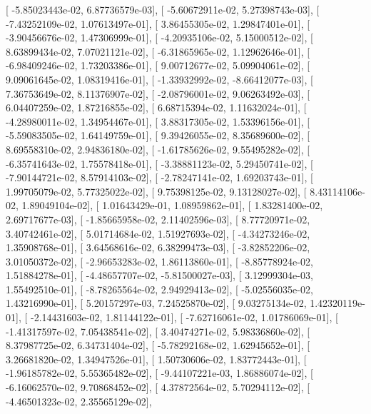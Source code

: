 \documentclass{article}
\begin{document}
       [ -5.85023443e-02,   6.87736579e-03],
       [ -5.60672911e-02,   5.27398743e-03],
       [ -7.43252109e-02,   1.07613497e-01],
       [  3.86455305e-02,   1.29847401e-01],
       [ -3.90456676e-02,   1.47306999e-01],
       [ -4.20935106e-02,   5.15000512e-02],
       [  8.63899434e-02,   7.07021121e-02],
       [ -6.31865965e-02,   1.12962646e-01],
       [ -6.98409246e-02,   1.73203386e-01],
       [  9.00712677e-02,   5.09904061e-02],
       [  9.09061645e-02,   1.08319416e-01],
       [ -1.33932992e-02,  -8.66412077e-03],
       [  7.36753649e-02,   8.11376907e-02],
       [ -2.08796001e-02,   9.06263492e-03],
       [  6.04407259e-02,   1.87216855e-02],
       [  6.68715394e-02,   1.11632024e-01],
       [ -4.28980011e-02,   1.34954467e-01],
       [  3.88317305e-02,   1.53396156e-01],
       [ -5.59083505e-02,   1.64149759e-01],
       [  9.39426055e-02,   8.35689600e-02],
       [  8.69558310e-02,   2.94836180e-02],
       [ -1.61785626e-02,   9.55495282e-02],
       [ -6.35741643e-02,   1.75578418e-01],
       [ -3.38881123e-02,   5.29450741e-02],
       [ -7.90144721e-02,   8.57914103e-02],
       [ -2.78247141e-02,   1.69203743e-01],
       [  1.99705079e-02,   5.77325022e-02],
       [  9.75398125e-02,   9.13128027e-02],
       [  8.43114106e-02,   1.89049104e-02],
       [  1.01643429e-01,   1.08959862e-01],
       [  1.83281400e-02,   2.69717677e-03],
       [ -1.85665958e-02,   2.11402596e-03],
       [  8.77720971e-02,   3.40742461e-02],
       [  5.01714684e-02,   1.51927693e-02],
       [ -4.34273246e-02,   1.35908768e-01],
       [  3.64568616e-02,   6.38299473e-03],
       [ -3.82852206e-02,   3.01050372e-02],
       [ -2.96653283e-02,   1.86113860e-01],
       [ -8.85778924e-02,   1.51884278e-01],
       [ -4.48657707e-02,  -5.81500027e-03],
       [  3.12999304e-03,   1.55492510e-01],
       [ -8.78265564e-02,   2.94929413e-02],
       [ -5.02556035e-02,   1.43216990e-01],
       [  5.20157297e-03,   7.24525870e-02],
       [  9.03275134e-02,   1.42320119e-01],
       [ -2.14431603e-02,   1.81144122e-01],
       [ -7.62716061e-02,   1.01786069e-01],
       [ -1.41317597e-02,   7.05438541e-02],
       [  3.40474271e-02,   5.98336860e-02],
       [  8.37987725e-02,   6.34731404e-02],
       [ -5.78292168e-02,   1.62945652e-01],
       [  3.26681820e-02,   1.34947526e-01],
       [  1.50730606e-02,   1.83772443e-01],
       [ -1.96185782e-02,   5.55365482e-02],
       [ -9.44107221e-03,   1.86886074e-02],
       [ -6.16062570e-02,   9.70868452e-02],
       [  4.37872564e-02,   5.70294112e-02],
       [ -4.46501323e-02,   2.35565129e-02],
\end{document}
